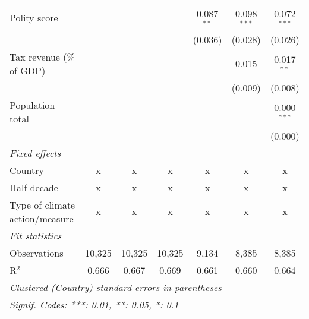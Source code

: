 \begin{tabular}{lcccccc}
   Polity score                                                      &         &               &                & 0.087$^{**}$   & 0.098$^{***}$  & 0.072$^{***}$\\   
                                                                     &         &               &                & (0.036)        & (0.028)        & (0.026)\\   
   Tax revenue (\% of GDP)                                           &         &               &                &                & 0.015          & 0.017$^{**}$\\   
                                                                     &         &               &                &                & (0.009)        & (0.008)\\   
   Population total                                                  &         &               &                &                &                & 0.000$^{***}$\\   
                                                                     &         &               &                &                &                & (0.000)\\   
   \emph{Fixed effects}\\
   Country                                                           & x       & x             & x              & x              & x              & x\\  
   Half decade                                                       & x       & x             & x              & x              & x              & x\\  
   Type of climate action/measure                                    & x       & x             & x              & x              & x              & x\\  
   \midrule \emph{Fit statistics}\\
   Observations                                                      & 10,325  & 10,325        & 10,325         & 9,134          & 8,385          & 8,385\\  
   R$^2$                                                             & 0.666   & 0.667         & 0.669          & 0.661          & 0.660          & 0.664\\  
   \midrule
   \multicolumn{7}{l}{\emph{Clustered (Country) standard-errors in parentheses}}\\
   \multicolumn{7}{l}{\emph{Signif. Codes: ***: 0.01, **: 0.05, *: 0.1}}\\
\end{tabular}
\par\endgroup



